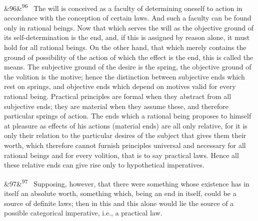 \documentclass[12pt]{article}
\newcommand{\para}[1][]{\par\noindent\ifx&#1&\else\textsuperscript{\footnotesize #1}~\fi}
\begin{document}
\para[96] The will is conceived as a faculty of determining oneself to action in accordance with the conception of certain laws. And such a faculty can be found only in rational beings. Now that which serves the will as the objective ground of its self-determination is the end, and, if this is assigned by reason alone, it must hold for all rational beings. On the other hand, that which merely contains the ground of possibility of the action of which the effect is the end, this is called the means. The subjective ground of the desire is the spring, the objective ground of the volition is the motive; hence the distinction between subjective ends which rest on springs, and objective ends which depend on motives valid for every rational being. Practical principles are formal when they abstract from all subjective ends; they are material when they assume these, and therefore particular springs of action. The ends which a rational being proposes to himself at pleasure as effects of his actions (material ends) are all only relative, for it is only their relation to the particular desires of the subject that gives them their worth, which therefore cannot furnish principles universal and necessary for all rational beings and for every volition, that is to say practical laws. Hence all these relative ends can give rise only to hypothetical imperatives.

\para[97] Supposing, however, that there were something whose existence has in itself an absolute worth, something which, being an end in itself, could be a source of definite laws; then in this and this alone would lie the source of a possible categorical imperative, i.e., a practical law.
\end{document}
